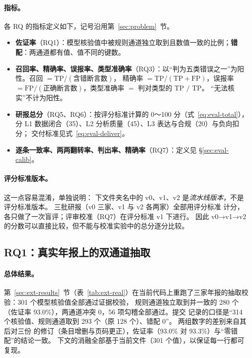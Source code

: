 \paragraph{指标。}各 RQ 的指标定义如下，记号沿用第~\ref{sec:problem}~节。
\begin{itemize}
  \item \textbf{佐证率}（RQ1）：模型核验值中被规则通道独立取到且数值一致的比例；\textbf{错配}：两通道都有值、值不同的键数。
  \item \textbf{召回率、精确率、误报率、类型准确率}（RQ3）：以“判为五类错误之一”为阳性。召回 $=\text{TP}/(\text{含错断言数})$，
        精确率 $=\text{TP}/(\text{TP}+\text{FP})$，误报率 $=\text{FP}/(\text{正确断言数})$，类型准确率 $=$ 判对类型的 TP $/$ TP。
        “无法核实”不计为阳性。
  \item \textbf{研报总分}（RQ5、RQ6）：按评分标准计算的 0～100 分（式~\eqref{eq:eval-total}），分 L1 数据闭合（35）、L2 分析质量（45）、L3 表达与合规（20）与负向扣分；
        交付标准见式~\eqref{eq:eval-deliver}。
  \item \textbf{逐条一致率、两两翻转率、判出率、精确率}（RQ7）：定义见 \S\ref{sec:eval-calib}。
\end{itemize}

\paragraph{评分标准版本。}这一点容易混淆，单独说明： 下文件夹名中的 v0、v1、v2 是\emph{流水线版本}，不是评分标准版本。
三批研报（v0 三家、v1 与 v2 各两家）全部用评分标准  计分，各只做了一次盲评；评审校准（RQ7）在评分标准 v1 下进行。
因此 v0→v1→v2 的分数可以直接比较，但不能与校准实验中的总分逐分比较。

\subsection{RQ1：真实年报上的双通道抽取}
\label{sec:exp-rq1}

\paragraph{总体结果。}第~\ref{sec:ext-results}~节（表~\ref{tab:ext-real}）在当前代码上重跑了三家年报的抽取校验：301 个模型核验值全部通过证据校验，
规则通道独立取到并一致的 280 个（佐证率 93.0\%），两通道冲突 0，56 项勾稽全部通过。提交  记录的口径是“314 个核验值、规则通道取到 293 个（原 128 个）、错配 0”。
两组数字的差别来自其后对三份  的修订（条目增删与页码更正），佐证率（93.0\% 对 93.3\%）与“零错配”的结论一致。
下文的消融全部基于当前文件（301 个值），以保证每一行都可复现。

